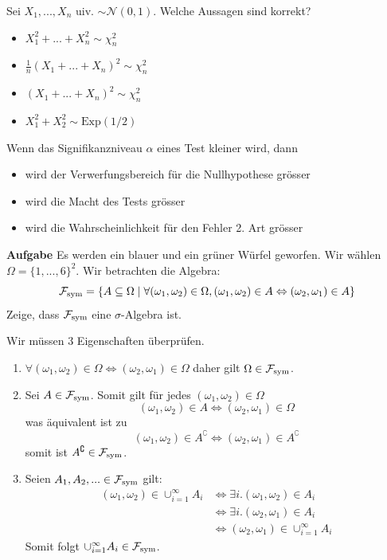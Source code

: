 \hrulefill

Sei $X_1,...,X_n$ uiv. $\sim \mathcal N(0,1)$. Welche Aussagen sind korrekt?
\begin{itemize}
	\item[\marked] $X_1^2 + ... + X_n^2 \sim \chi_n^2$
	\item[\marked] $\frac{1}{n} (X_1 + ... + X_n)^2 \sim \chi_n^2$
	\item[$\square$] $(X_1 + ... + X_n)^2 \sim \chi_n^2$
	\item[\marked] $X_1^2 + X_2^2 \sim \text{Exp}(1/2)$
\end{itemize}

\hrulefill

Wenn das Signifikanzniveau $\alpha$ eines Test kleiner wird, dann
\begin{itemize}
	\item[$\square$] wird der Verwerfungsbereich für die Nullhypothese grösser
	\item[$\square$] wird die Macht des Tests grösser
	\item[\marked] wird die Wahrscheinlichkeit für den Fehler 2. Art grösser
\end{itemize}



\textbf{Aufgabe}
Es werden ein blauer und ein grüner Würfel geworfen. Wir wählen $\Omega = \{1,...,6\}^2$. Wir betrachten die Algebra:
$$\mathcal{F}_{\text{sym}} = \{ A \subseteq \Omega \; | \; \forall (\omega_1, \omega_2) \in \Omega, (\omega_1, \omega_2) \in A \Leftrightarrow (\omega_2, \omega_1) \in A  \}$$
Zeige, dass $\mathcal{F}_{\text{sym}}$ eine $\sigma$-Algebra ist. \medskip

Wir müssen 3 Eigenschaften überprüfen. 
\begin{enumerate}
	\item $\forall (\omega_1, \omega_2) \in \Omega \Leftrightarrow (\omega_2, \omega_1) \in \Omega$ daher gilt $\Omega \in \mathcal{F}_{\text{sym}}$.
	\item Sei $A \in \mathcal{F}_{\text{sym}}$. Somit gilt für jedes $(\omega_1, \omega_2) \in \Omega$
		$$(\omega_1, \omega_2) \in A \Leftrightarrow (\omega_2, \omega_1) \in \Omega$$
		was äquivalent ist zu
		$$(\omega_1, \omega_2) \in A^\complement \Leftrightarrow (\omega_2, \omega_1) \in A^\complement$$
		somit ist $A^\complement \in \mathcal{F}_{\text{sym}}$.
	\item Seien $A_1, A_2, ... \in \mathcal{F}_{\text{sym}}$ gilt:
		\begin{align*}
			(\omega_1, \omega_2) \in \cup_{i=1}^\infty A_i &\Leftrightarrow \exists i. (\omega_1, \omega_2) \in A_i \\
			&\Leftrightarrow \exists i. (\omega_2, \omega_1) \in A_i \\
			&\Leftrightarrow (\omega_2, \omega_1) \in \cup_{i=1}^\infty A_i
		\end{align*}
		Somit folgt $\cup_{i=1}^\infty A_i \in \mathcal{F}_{\text{sym}}$.
\end{enumerate}

